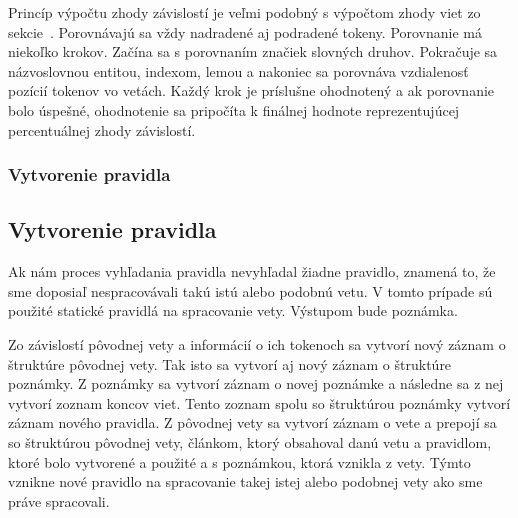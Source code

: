 Princíp výpočtu zhody závislostí je veľmi podobný s výpočtom zhody viet zo sekcie~. Porovnávajú sa vždy nadradené aj podradené tokeny. Porovnanie má niekoľko krokov. Začína sa s porovnaním značiek slovných druhov. Pokračuje sa názvoslovnou entitou, indexom, lemou a nakoniec sa porovnáva vzdialenosť pozícií tokenov vo vetách. Každý krok je príslušne ohodnotený a ak porovnanie bolo úspešné, ohodnotenie sa pripočíta k finálnej hodnote reprezentujúcej percentuálnej zhody závislostí.

%
%
{
	\subsubsection{Vytvorenie pravidla}
}
{
	\subsection{Vytvorenie pravidla}
}
\label{subsubsection:rule_creation}
Ak nám proces vyhľadania pravidla nevyhľadal žiadne pravidlo, znamená to, že sme doposiaľ nespracovávali takú istú alebo podobnú vetu. V tomto prípade sú použité statické pravidlá na spracovanie vety. Výstupom bude poznámka.

Zo závislostí pôvodnej vety a informácií o ich tokenoch sa vytvorí nový záznam o štruktúre pôvodnej vety. Tak isto sa vytvorí aj nový záznam o štruktúre poznámky. Z poznámky sa vytvorí záznam o novej poznámke a následne sa z nej vytvorí zoznam koncov viet. Tento zoznam spolu so štruktúrou poznámky vytvorí záznam nového pravidla. Z pôvodnej vety sa vytvorí záznam o vete a prepojí sa so štruktúrou pôvodnej vety, článkom, ktorý obsahoval danú vetu a pravidlom, ktoré bolo vytvorené a použité a s poznámkou, ktorá vznikla z vety. Týmto vznikne nové pravidlo na spracovanie takej istej alebo podobnej vety ako sme práve spracovali.




